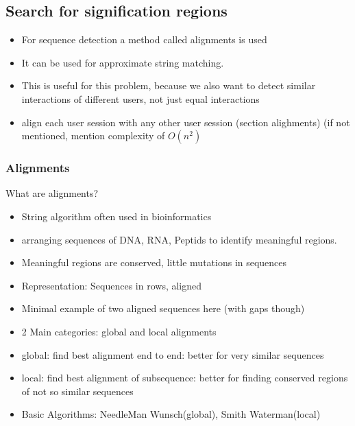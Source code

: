\begin{itemize}
\subsection{Search for signification regions}		
\begin{itemize}
	\item For sequence detection a method called alignments is used
	\item It can be used for approximate string matching. 
	\item This is useful for this problem, because we also want to detect similar interactions of different users, not just equal interactions
	\item align each user session with any other user session (section alighments)  (if not mentioned, mention complexity of $O(n^2)$
\end{itemize}
\subsubsection{Alignments}
What are alignments? 
\begin{itemize}
	\item String algorithm often used in bioinformatics 
	\item arranging sequences of DNA, RNA, Peptids to identify meaningful regions.
	\item Meaningful regions are conserved, little mutations in sequences
	\item Representation: Sequences in rows, aligned 
	\item Minimal example of two aligned sequences here (with gaps though)
	\item 2 Main categories: global and local alignments 
	\item global: find best alignment end to end: better for very similar sequences
	\item local: find best alignment of subsequence: better for finding conserved regions of not so similar sequences
	\item Basic Algorithms: NeedleMan Wunsch(global), Smith Waterman(local) 
\end{itemize} 


\end{itemize}
